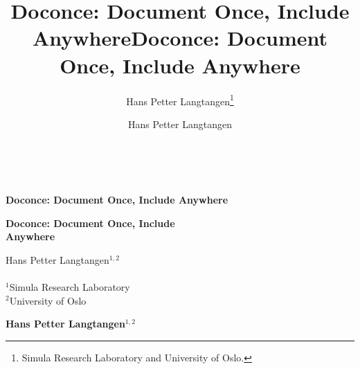 \documentclass[%
oneside,                 %
final,                   %
chapterprefix=true,      %
open=right               %
10pt]{book}
\begin{document}






\title{Doconce: Document Once, Include Anywhere}


\thispagestyle{empty}
\hbox{\ \ }
\vfill
\begin{center}
{\huge{\bfseries{Doconce: Document Once, Include Anywhere}}}


\title*{Doconce: Document Once, Include Anywhere}


\begin{center}
{\LARGE\bf Doconce: Document Once, Include \\ [1.5mm] Anywhere}
\end{center}




\author{Hans Petter Langtangen\footnote{Simula Research Laboratory and University of Oslo.}}

\vspace{1.3cm}

    {\Large\textsf{Hans Petter Langtangen${}^{1, 2}$}}\\ [3mm]
    
\ \\ [2mm]

{\large\textsf{${}^1$Simula Research Laboratory} \\ [1.5mm]}
{\large\textsf{${}^2$University of Oslo} \\ [1.5mm]}

\author{Hans Petter Langtangen}


\begin{center}
{\bf Hans Petter Langtangen${}^{1, 2}$} \\ [0mm]
\end{center}


\end{center}
\end{document}
